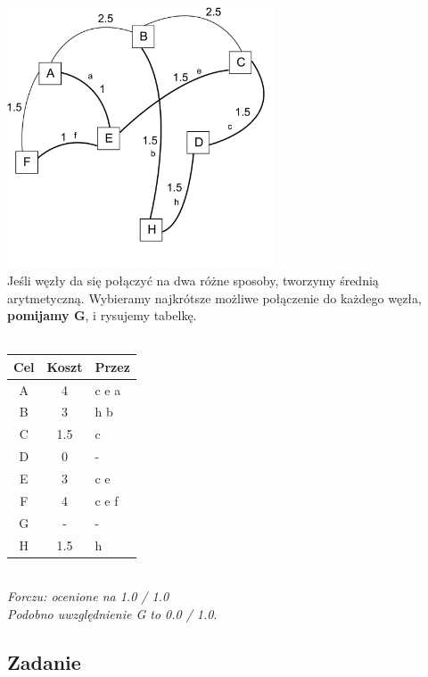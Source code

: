 				\includegraphics[width=8.0cm]{./images/zadanie06.pdf}\\
			Jeśli węzły da się połączyć na dwa różne sposoby, tworzymy średnią arytmetyczną. Wybieramy najkrótsze możliwe połączenie do każdego węzła, \textbf{pomijamy G}, i rysujemy tabelkę.\\\\ 
			\begin{tabular}{c|c|l}
				Cel & Koszt & Przez \\ \hline
				A   & 4     & c e a \\
				B   & 3     & h b   \\
				C   & 1.5   & c     \\
				D   & 0     & -     \\
				E   & 3     & c e   \\
				F   & 4     & c e f \\
				G   & -     & -     \\
				H   & 1.5   & h     
			\end{tabular}\\
			\small{ \emph{Forczu: ocenione na 1.0 / 1.0\\
					Podobno uwzględnienie G to 0.0 / 1.0}}.
	\subsection{Zadanie}
